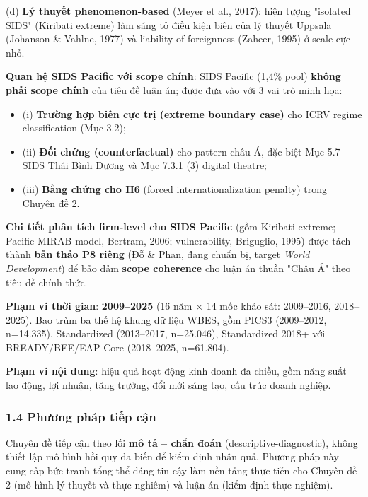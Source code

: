 \documentclass[12pt,a4paper]{article}
\providecommand{\tightlist}{\setlength{\itemsep}{0pt}\setlength{\parskip}{0pt}}
\begin{document}
(d) \textbf{Lý thuyết phenomenon-based} (Meyer et al., 2017): hiện tượng
"isolated SIDS" (Kiribati extreme) làm sáng tỏ điều kiện biên của lý
thuyết Uppsala (Johanson \& Vahlne, 1977) và liability of foreignness
(Zaheer, 1995) ở scale cực nhỏ.

\textbf{Quan hệ SIDS Pacific với scope chính}: SIDS Pacific (1,4\% pool)
\textbf{không phải scope chính} của tiêu đề luận án; được đưa vào với 3
vai trò minh họa:

\begin{itemize}
\tightlist
\item
  (i) \textbf{Trường hợp biên cực trị (extreme boundary case)} cho ICRV
  regime classification (Mục 3.2);
\item
  (ii) \textbf{Đối chứng (counterfactual)} cho pattern châu Á, đặc biệt
  Mục 5.7 SIDS Thái Bình Dương và Mục 7.3.1 (3) digital theatre;
\item
  (iii) \textbf{Bằng chứng cho H6} (forced internationalization penalty)
  trong Chuyên đề 2.
\end{itemize}

\textbf{Chi tiết phân tích firm-level cho SIDS Pacific} (gồm Kiribati
extreme; Pacific MIRAB model, Bertram, 2006; vulnerability, Briguglio,
1995) được tách thành \textbf{bản thảo P8 riêng} (Đỗ \& Phan, đang chuẩn
bị, target \emph{World Development}) để bảo đảm \textbf{scope coherence}
cho luận án thuần "Châu Á" theo tiêu đề chính thức.

\textbf{Phạm vi thời gian}: \textbf{2009--2025} (16 năm × 14 mốc khảo
sát: 2009--2016, 2018--2025). Bao trùm ba thế hệ khung dữ liệu WBES, gồm
PICS3 (2009--2012, n=14.335), Standardized (2013--2017, n=25.046),
Standardized 2018+ với BREADY/BEE/EAP Core (2018--2025, n=61.804).

\textbf{Phạm vi nội dung}: hiệu quả hoạt động kinh doanh đa chiều, gồm
năng suất lao động, lợi nhuận, tăng trưởng, đổi mới sáng tạo, cấu trúc
doanh nghiệp.

\hypertarget{14-phux1b0ux1a1ng-phuxe1p-tiux1ebfp-cux1eadn}{%
\subsubsection{1.4 Phương pháp tiếp
cận}\label{14-phux1b0ux1a1ng-phuxe1p-tiux1ebfp-cux1eadn}}

Chuyên đề tiếp cận theo lối \textbf{mô tả -- chẩn đoán}
(descriptive-diagnostic), không thiết lập mô hình hồi quy đa biến để
kiểm định nhân quả. Phương pháp này cung cấp bức tranh tổng thể đáng tin
cậy làm nền tảng thực tiễn cho Chuyên đề 2 (mô hình lý thuyết và thực
nghiêm) và luận án (kiểm định thực nghiệm).
\end{document}
